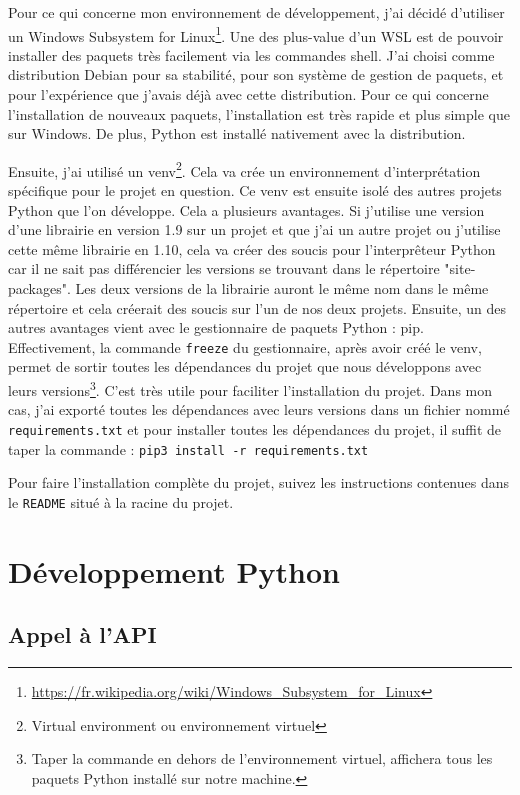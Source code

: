 \documentclass[a4paper,14pt]{extarticle}
\begin{document}
{Pour ce qui concerne mon environnement de développement, j'ai décidé d'utiliser un Windows Subsystem for Linux\footnote{\url{https://fr.wikipedia.org/wiki/Windows_Subsystem_for_Linux}}. Une des plus-value d'un WSL est de pouvoir installer des paquets très facilement via les commandes shell. J'ai choisi comme distribution Debian pour sa stabilité, pour son système de gestion de paquets, et pour l'expérience que j'avais déjà avec cette distribution.  Pour ce qui concerne l'installation de nouveaux paquets, l'installation est très rapide et plus simple que sur Windows. De plus, Python est installé nativement avec la distribution.

Ensuite, j'ai utilisé un venv\footnote{Virtual environment ou environnement virtuel}. Cela va crée un environnement d'interprétation spécifique pour le projet en question. Ce venv est ensuite isolé des autres projets Python que l'on développe. 
Cela a plusieurs avantages. Si j'utilise une version d'une librairie en version 1.9 sur un projet et que j'ai un autre projet ou j'utilise cette même librairie en 1.10, cela va créer des soucis pour l'interprêteur Python car il ne sait pas différencier les versions se trouvant dans le répertoire "site-packages". Les deux versions de la librairie auront le même nom dans le même répertoire et cela créerait des soucis sur l'un de nos deux projets.
Ensuite, un des autres avantages vient avec le gestionnaire de paquets Python : pip. Effectivement, la commande \texttt{freeze} du gestionnaire, après avoir créé le venv, permet de sortir toutes les dépendances du projet que nous développons avec leurs versions\footnote{Taper la commande en dehors de l'environnement virtuel, affichera tous les paquets Python installé sur notre machine.}. C'est très utile pour faciliter l'installation du projet.
Dans mon cas, j'ai exporté toutes les dépendances avec leurs versions dans un fichier nommé \texttt{requirements.txt} et pour installer toutes les dépendances du projet, il suffit de taper la commande :
\noindent\texttt{pip3 install -r requirements.txt}

Pour faire l'installation complète du projet, suivez les instructions contenues dans le \texttt{README} situé à la racine du projet.

\newpage

\section{Développement Python}

\subsection{Appel à l'API}

}
\end{document}
